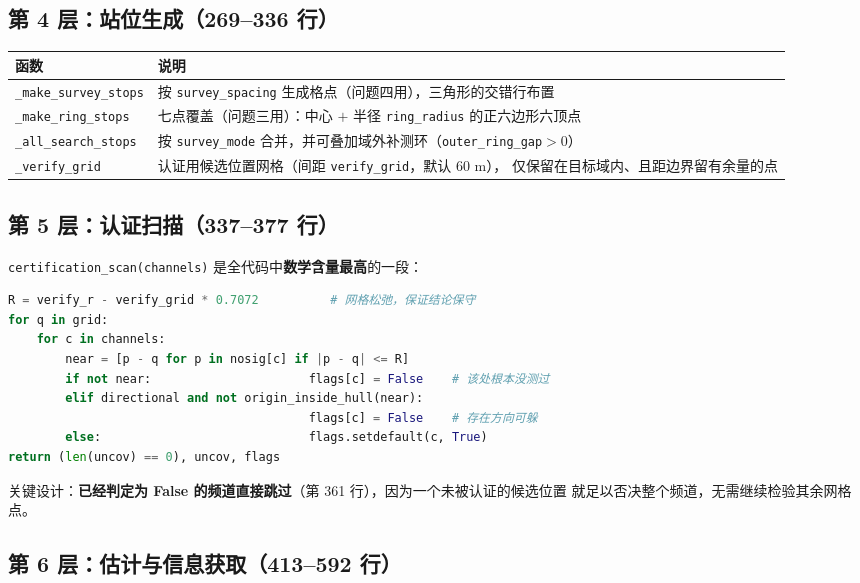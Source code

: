 \subsection{第 4 层：站位生成（269--336 行）}

\begin{tabular}{lp{10.6cm}}
\toprule
函数 & 说明 \\ \midrule
\texttt{\_make\_survey\_stops} & 按 \texttt{survey\_spacing} 生成格点（问题四用），三角形的交错行布置 \\
\texttt{\_make\_ring\_stops} & 七点覆盖（问题三用）：中心 $+$ 半径 \texttt{ring\_radius} 的正六边形六顶点 \\
\texttt{\_all\_search\_stops} & 按 \texttt{survey\_mode} 合并，并可叠加域外补测环（\texttt{outer\_ring\_gap}$>0$） \\
\texttt{\_verify\_grid} & 认证用候选位置网格（间距 \texttt{verify\_grid}，默认 60 m），
仅保留在目标域内、且距边界留有余量的点 \\
\bottomrule
\end{tabular}

\subsection{第 5 层：认证扫描（337--377 行）}

\texttt{certification\_scan(channels)} 是全代码中\textbf{数学含量最高}的一段：

\begin{lstlisting}[language=Python,caption={认证扫描的两种判据}]
R = verify_r - verify_grid * 0.7072          # 网格松弛，保证结论保守
for q in grid:
    for c in channels:
        near = [p - q for p in nosig[c] if |p - q| <= R]
        if not near:                      flags[c] = False    # 该处根本没测过
        elif directional and not origin_inside_hull(near):
                                          flags[c] = False    # 存在方向可躲
        else:                             flags.setdefault(c, True)
return (len(uncov) == 0), uncov, flags
\end{lstlisting}

关键设计：\textbf{已经判定为 False 的频道直接跳过}（第 361 行），因为一个未被认证的候选位置
就足以否决整个频道，无需继续检验其余网格点。

\subsection{第 6 层：估计与信息获取（413--592 行）}

